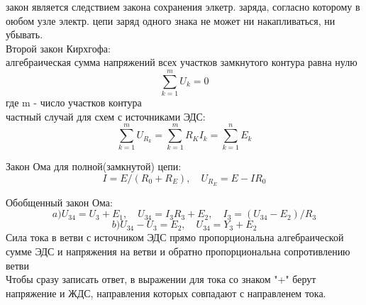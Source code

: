 \documentclass[a4paper, 12pt]{article}
\begin{document}
закон является следствием закона сохранения элкетр. заряда, согласно которому в оюбом узле электр. цепи заряд одного знака не может ни накапливаться, ни убывать.\\

Второй закон Кирхгофа:\\
алгебраическая сумма напряжений всех участков замкнутого контура равна нулю\\
\[
	\sum_{k=1}^{m} U_k = 0 
\]
где m - число участков контура\\

частный случай для схем с источниками ЭДС:
\[
	\sum_{k=1}^{m} U_{R_k} = \sum_{k=1}^{m} R_KI_k = \sum_{k=1}^{n} E_k   
\]

Закон Ома для полной(замкнутой) цепи:
\[
	I = E/(R_0 + R_E), \quad  U_{R_E} = E - IR_0
\]

Обобщенный закон Ома:
\[
	a)U_{34} = U_3 + E_1, \quad U_{34} = I_3R_3 + E_2, \quad I_3 = (U_{34} - E_2)/R_3
\]
\[
	b)U_{34} - U_3 = E_2, \quad U_{34} = Y_3 + E_2
\]
Сила тока в ветви с источником ЭДС прямо пропорциональна алгебраической сумме ЭДС и напряжения на ветви и обратно пропорциональна сопротивлению ветви\\
Чтобы сразу записать ответ, в выражении для тока со знаком "+" берут напряжение и ЖДС, направления которых совпадают с направленем тока.
\end{document}
